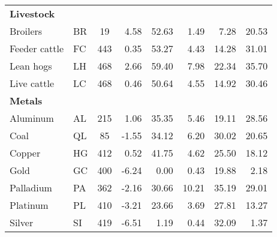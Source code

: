 \begin{tabular}{l l c r r r r r}
\midrule
\multicolumn{8}{l}{\textbf{Livestock}} \\
Broilers      & BR &  19 &  4.58 & 52.63 &  1.49 &  7.28 & 20.53 \\
Feeder cattle & FC & 443 &  0.35 & 53.27 &  4.43 & 14.28 & 31.01 \\
Lean hogs     & LH & 468 &  2.66 & 59.40 &  7.98 & 22.34 & 35.70 \\
Live cattle   & LC & 468 &  0.46 & 50.64 &  4.55 & 14.92 & 30.46 \\
\midrule
\multicolumn{8}{l}{\textbf{Metals}} \\
Aluminum      & AL & 215 &  1.06 & 35.35 &  5.46 & 19.11 & 28.56 \\
Coal          & QL &  85 & -1.55 & 34.12 &  6.20 & 30.02 & 20.65 \\
Copper        & HG & 412 &  0.52 & 41.75 &  4.62 & 25.50 & 18.12 \\
Gold          & GC & 400 & -6.24 &  0.00 &  0.43 & 19.88 &  2.18 \\
Palladium     & PA & 362 & -2.16 & 30.66 & 10.21 & 35.19 & 29.01 \\
Platinum      & PL & 410 & -3.21 & 23.66 &  3.69 & 27.81 & 13.27 \\
Silver        & SI & 419 & -6.51 &  1.19 &  0.44 & 32.09 &  1.37 \\
\bottomrule
\end{tabular}
